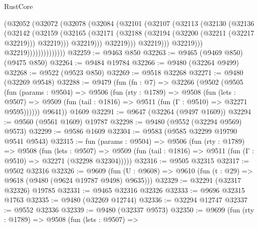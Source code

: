 \begin{lexlean}{RustCore}
\begin{coremodule}
                                (@32052
                                  (@32072
                                    (@32078
                                      (@32084
                                        (@32101
                                          (@32107
                                            (@32113
                                              (@32130
                                                (@32136
                                                  (@32142
                                                    (@32159
                                                      (@32165
                                                        (@32171
                                                          (@32188
                                                            (@32194
                                                              (@32200 (@32211 (@32217 @32219)))
                                                              @32219)))
                                                        @32219)))
                                                  @32219)))
                                            @32219)))
                                      @32219)))
                                @32219))))))))))))))
@32259 := @9463 @850
@32263 := @9465 (@9469 @850) (@9475 @850)
@32264 := @9484 @19784
@32266 := @9480 (@32264 @9499)
@32268 := @9522 (@9523 @850)
@32269 := @9518 @32268
@32271 := @9480 (@32269 @9548)
@32288 := @9479
    (fun (fn : @7) =>
    @32266
      (@9502
        (@9505
          (fun (params : @9504) =>
          @9506
            (fun (rty : @1789) =>
            @9508
              (fun (lets : @9507) =>
              @9509 (fun (tail : @1816) => @9511 (fun (Γ : @9510) => @32271 @9595))))))
        @9641))
    @1609
@32291 := @9647 (@32264 (@9497 @1609))
@32294 := @9560 (@9561 @1609) @19787
@32298 := @9480 (@9552 (@32294 @9569) @9573)
@32299 := @9586 @1609
@32304 := @9583 (@9585 @32299 @19790 @9541 @9543)
@32315 := fun (params : @9504) =>
  @9506
    (fun (rty : @1789) =>
    @9508
      (fun (lets : @9507) =>
      @9509 (fun (tail : @1816) => @9511 (fun (Γ : @9510) => @32271 (@32298 @32304)))))
@32316 := @9505 @32315
@32317 := @9502 @32316
@32326 := @9609
    (fun (U : @9608) => @9610 (fun (t : @29) => @9618 (@9480 (@9624 @19787 @9498) @9635)))
@32329 := @32291 (@32317 @32326) @19785
@32331 := @9465 @32316 @32326
@32333 := @9696 @32315 @1763
@32335 := @9480 (@32269 @12744)
@32336 := @32294 @12747
@32337 := @9552 @32336
@32339 := @9480 (@32337 @9573)
@32350 := @9699
    (fun (rty : @1789) =>
    @9508
      (fun (lets : @9507) =>

\end{coremodule}
\end{lexlean}
